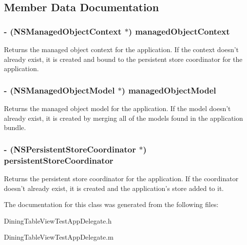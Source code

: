 \subsection{Member Data Documentation}
\hypertarget{interface_dining_table_view_test_app_delegate_ae0ffa5eb42dd103b6708377045afc6df}{
\subsubsection[{managedObjectContext}]{\setlength{\rightskip}{0pt plus 5cm}-\/ (NSManagedObjectContext $\ast$) {\bf managedObjectContext}}}
\label{interface_dining_table_view_test_app_delegate_ae0ffa5eb42dd103b6708377045afc6df}
Returns the managed object context for the application. If the context doesn't already exist, it is created and bound to the persistent store coordinator for the application. \hypertarget{interface_dining_table_view_test_app_delegate_af07ec7ac706012aded6a2ac49aba70f3}{
\subsubsection[{managedObjectModel}]{\setlength{\rightskip}{0pt plus 5cm}-\/ (NSManagedObjectModel $\ast$) {\bf managedObjectModel}}}
\label{interface_dining_table_view_test_app_delegate_af07ec7ac706012aded6a2ac49aba70f3}
Returns the managed object model for the application. If the model doesn't already exist, it is created by merging all of the models found in the application bundle. \hypertarget{interface_dining_table_view_test_app_delegate_a78473b03e27135c4bf6312909230821d}{
\subsubsection[{persistentStoreCoordinator}]{\setlength{\rightskip}{0pt plus 5cm}-\/ (NSPersistentStoreCoordinator $\ast$) {\bf persistentStoreCoordinator}}}
\label{interface_dining_table_view_test_app_delegate_a78473b03e27135c4bf6312909230821d}
Returns the persistent store coordinator for the application. If the coordinator doesn't already exist, it is created and the application's store added to it. 

The documentation for this class was generated from the following files:\begin{DoxyCompactItemize}
\item 
DiningTableViewTestAppDelegate.h\item 
DiningTableViewTestAppDelegate.m\end{DoxyCompactItemize}
